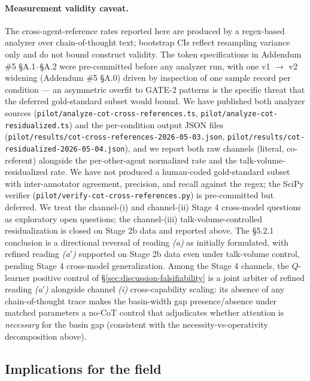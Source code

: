 \paragraph{Measurement validity caveat.}
The cross-agent-reference rates reported here are produced by a regex-based analyzer over chain-of-thought text; bootstrap CIs reflect resampling variance only and do not bound construct validity. The token specifications in Addendum \#5 \S A.1--\S A.2 were pre-committed before any analyzer run, with one v1 $\to$ v2 widening (Addendum \#5 \S A.0) driven by inspection of one sample record per condition --- an asymmetric overfit to GATE-2 patterns is the specific threat that the deferred gold-standard subset would bound. We have published both analyzer sources (\texttt{pilot/analyze-cot-cross-references.ts}, \texttt{pilot/analyze-cot-residualized.ts}) and the per-condition output JSON files (\texttt{pilot/results/cot-cross-references-2026-05-03.json}, \texttt{pilot/results/cot-residualized-2026-05-04.json}), and we report both raw channels (literal, co-referent) alongside the per-other-agent normalized rate and the talk-volume-residualized rate. We have not produced a human-coded gold-standard subset with inter-annotator agreement, precision, and recall against the regex; the SciPy verifier (\texttt{pilot/verify-cot-cross-references.py}) is pre-committed but deferred. We treat the channel-(i) and channel-(ii) Stage 4 cross-model questions as exploratory open questions; the channel-(iii) talk-volume-controlled residualization is closed on Stage 2b data and reported above. The §5.2.1 conclusion is a directional reversal of reading \emph{(a)} as initially formulated, with refined reading \emph{(a$'$)} supported on Stage 2b data even under talk-volume control, pending Stage 4 cross-model generalization. Among the Stage 4 channels, the $Q$-learner positive control of \S\ref{sec:discussion-falsifiability} is a joint arbiter of refined reading \emph{(a$'$)} alongside channel \emph{(i)} cross-capability scaling: its absence of any chain-of-thought trace makes the basin-width gap presence/absence under matched parameters a no-CoT control that adjudicates whether attention is \emph{necessary} for the basin gap (consistent with the necessity-vs-operativity decomposition above).

\subsection{Implications for the field}
\label{sec:discussion-implications}

